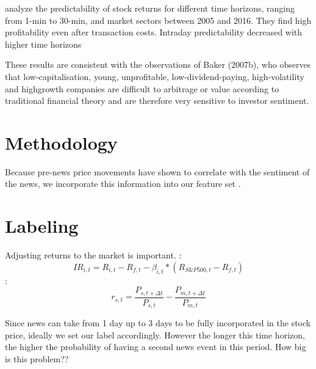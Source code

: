 \documentclass[12pt,a4paper]{article}
\begin{document}
	
	\bigskip
	\textbf{\cite{liu_intraday_2023}} analyze the predictability of stock returns for different time horizons, ranging from 1-min to 30-min, and market sectors between 2005 and 2016.
	They find high profitability even after transaction costs.
	Intraday predictability decreased with higher time horizons
	
	
	\bigskip
	These results are consistent with the observations of Baker (2007b), who observes that low-capitalisation, young, unprofitable, low-dividend-paying, high-volatility and highgrowth companies are difficult to arbitrage or value according to traditional financial theory and are therefore very sensitive to investor sentiment.
	
	
	\section{Methodology}
	Because pre-news price movements have shown to correlate with the sentiment of the news, we incorporate this information
	into our feature set \cite{ke_predicting_2020}.
	
	\section{Labeling}
	Adjusting returns to the market is important.
	\cite{salbrechter_financial_2021-1}:
	$$
	I R_{i, t}=R_{i, t}-R_{f, t}-\beta_{i, t} *\left(R_{S \& P 500, t}-R_{f, t}\right)
	$$
	\cite{chen_stock_2021}:
	$$
	r_{s, t}=\frac{P_{s, t+\Delta t}}{P_{s, t}}-\frac{P_{m, t+\Delta t}}{P_{m, t}}
	$$
	
	
	Since news can take from 1 day up to 3 days to be fully incorporated in the stock price, ideally we set our label accordingly.
	However the longer this time horizon, the higher the probability of having a second news event in this period.
	How big is this problem??
	
	
	
	
	
\end{document}
